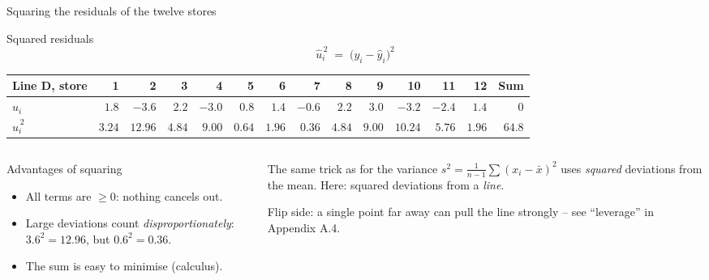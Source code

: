 \documentclass[aspectratio=169,11pt]{beamer}
\begin{document}
\begin{frame}{Squaring the residuals of the twelve stores}
  \begin{block}{Squared residuals}
    \[
      \hat{u}_i^{\,2} \;=\; \bigl(y_i - \hat{y}_i\bigr)^{2}
    \]
    \vspace{-12pt}
  \end{block}

  \begin{center}
    \scriptsize
    \renewcommand{\arraystretch}{1.1}
    \setlength{\tabcolsep}{4pt}
    \begin{tabular}{l*{12}{r}r}
      \toprule
      Line D, store & 1 & 2 & 3 & 4 & 5 & 6 & 7 & 8 & 9 & 10 & 11 & 12 & Sum \\
      \midrule
      $\hat{u}_i$       & $1.8$  & $-3.6$  & $2.2$  & $-3.0$ & $0.8$  & $1.4$  & $-0.6$ & $2.2$  & $3.0$  & $-3.2$  & $-2.4$ & $1.4$  & $0$ \\
      $\hat{u}_i^{\,2}$ & $3.24$ & $12.96$ & $4.84$ & $9.00$ & $0.64$ & $1.96$ & $0.36$ & $4.84$ & $9.00$ & $10.24$ & $5.76$ & $1.96$ & $\mathbf{64.8}$ \\
      \bottomrule
    \end{tabular}
  \end{center}

  \begin{columns}[T]
    \begin{column}{0.55\textwidth}
      \begin{block}{Advantages of squaring}
        \begin{itemize}
          \item All terms are $\ge 0$: nothing cancels out.
          \item Large deviations count \emph{disproportionately}:
                $3.6^{2} = 12.96$, but $0.6^{2} = 0.36$.
          \item The sum is easy to minimise (calculus).
        \end{itemize}
      \end{block}
    \end{column}
    \begin{column}{0.43\textwidth}
      \begin{exampleblock}{The same trick as for the variance}
        $s^{2} = \frac{1}{n-1}\sum (x_i - \bar{x})^{2}$ uses \emph{squared}
        deviations from the mean. Here: squared deviations from a
        \emph{line}.
      \end{exampleblock}
      \footnotesize Flip side: a single point far away can pull the line
      strongly -- see ``leverage'' in Appendix A.4.
    \end{column}
  \end{columns}
\end{frame}
\end{document}
